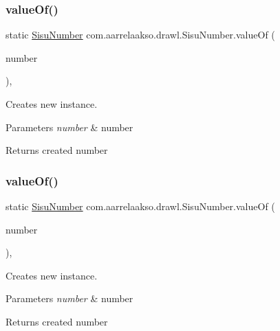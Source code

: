 \subsubsection{\texorpdfstring{value\+Of()}{valueOf()}\hspace{0.1cm}{\footnotesize\ttfamily [2/4]}}
{\footnotesize\ttfamily static \hyperlink{classcom_1_1aarrelaakso_1_1drawl_1_1_sisu_number}{Sisu\+Number} com.\+aarrelaakso.\+drawl.\+Sisu\+Number.\+value\+Of (\begin{DoxyParamCaption}\item[{double}]{number }\end{DoxyParamCaption})\hspace{0.3cm}{\ttfamily [static]}, {\ttfamily [protected]}}



Creates new instance. 


\begin{DoxyParams}{Parameters}
{\em number} & number \\
\hline
\end{DoxyParams}
\begin{DoxyReturn}{Returns}
created number 
\end{DoxyReturn}
\mbox{\label{classcom_1_1aarrelaakso_1_1drawl_1_1_sisu_number_a6cf69a1e3d5930733a6450547e238fa6}} 
\subsubsection{\texorpdfstring{value\+Of()}{valueOf()}\hspace{0.1cm}{\footnotesize\ttfamily [3/4]}}
{\footnotesize\ttfamily static \hyperlink{classcom_1_1aarrelaakso_1_1drawl_1_1_sisu_number}{Sisu\+Number} com.\+aarrelaakso.\+drawl.\+Sisu\+Number.\+value\+Of (\begin{DoxyParamCaption}\item[{Big\+Decimal}]{number }\end{DoxyParamCaption})\hspace{0.3cm}{\ttfamily [static]}, {\ttfamily [protected]}}



Creates new instance. 


\begin{DoxyParams}{Parameters}
{\em number} & number \\
\hline
\end{DoxyParams}
\begin{DoxyReturn}{Returns}
created number 
\end{DoxyReturn}
\mbox{\label{classcom_1_1aarrelaakso_1_1drawl_1_1_sisu_number_accb397fda90ea57fefeab7da195d4dd0}} 
